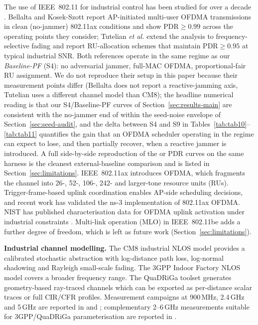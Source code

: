 \documentclass[journal,onecolumn,11pt,a4paper]{IEEEtran}
\begin{document}
The use of IEEE~802.11 for industrial control has been studied for
over a decade \cite{Aij20,Fan24,Bel19}. Bellalta and Kosek-Szott
\cite{Bel19} report AP-initiated multi-user OFDMA transmissions in
clean (no-jammer) 802.11ax conditions and show $\mathrm{PDR}\ge
0.99$ across the operating points they consider; Tutelian
\emph{et al.}\xspace \cite{Tut21} extend the analysis to frequency-selective
fading and report RU-allocation schemes that maintain
$\mathrm{PDR}\ge 0.95$ at typical industrial SNR. Both
references operate in the same regime as our \emph{Baseline-PF}
(S4): no adversarial jammer, full-MAC OFDMA, proportional-fair
RU assignment. We do not reproduce their setup in this paper
because their measurement points differ (Bellalta does not
report a reactive-jamming axis, Tutelian uses a different channel
model than CM8); the headline numerical reading is that our
S4/Baseline-PF curves of Section~\ref{sec:results-main} are
consistent with the no-jammer end of \cite{Bel19,Tut21} within
the seed-noise envelope of Section~\ref{sec:seed-audit}, and the
delta between S4 and S9 in Tables~\ref{tab:tab10}--\ref{tab:tab11}
quantifies the gain that an OFDMA scheduler operating in the
\cite{Bel19,Tut21} regime can expect to lose, and then partially
recover, when a reactive jammer is introduced. A full
side-by-side reproduction of the \cite{Bel19} or \cite{Tut21}
PDR curves on the same harness is the cleanest external-baseline
comparison and is listed in
Section~\ref{sec:limitations}. IEEE~802.11ax \cite{Kho19} introduces
OFDMA, which fragments the channel into 26-, 52-, 106-, 242- and
larger-tone resource units (RUs). Trigger-frame-based uplink
coordination \cite{Ban18,Bel19,Tut21} enables AP-side scheduling
decisions, and recent work \cite{Mag21} has validated the ns-3
implementation of 802.11ax OFDMA. NIST has published characterisation
data for OFDMA uplink activation under industrial constraints
\cite{Mon24}. Multi-link operation (MLO) in IEEE~802.11be
\cite{Lop19,Den20} adds a further degree of freedom, which is left as
future work (Section~\ref{sec:limitations}).

\textbf{Industrial channel modelling.} The CM8 industrial NLOS model
\cite{Mol09,Mol04} provides a calibrated stochastic abstraction with
log-distance path loss, log-normal shadowing and Rayleigh small-scale
fading. The 3GPP Indoor Factory NLOS model \cite{TR38901}
covers a broader frequency range. The QuaDRiGa toolset \cite{Jae14}
generates geometry-based ray-traced channels which can be exported as
per-distance scalar traces or full CIR/CFR profiles. Measurement
campaigns at 900\,MHz, 2.4\,GHz and 5\,GHz are reported in
\cite{Tan08} and \cite{Tra18}; complementary 2--6\,GHz measurements
suitable for 3GPP/QuaDRiGa parameterisation are reported in
\cite{Wil19}.
\end{document}
